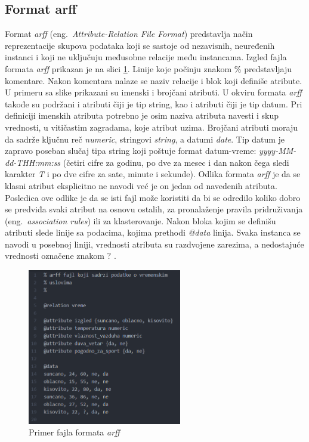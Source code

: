 \documentclass[12pt,oneside]{memoir}
\begin{document}
\subsection{Format arff}
Format \textit{arff} (eng.~\textit{Attribute-Relation File Format}) predstavlja način reprezentacije skupova podataka koji se sastoje od nezavisnih, neuređenih instanci i koji ne uključuju međusobne relacije među instancama. Izgled fajla formata \textit{arff} prikazan je na slici \ref{fig:arff}. Linije koje počinju znakom \% predstavljaju komentare. Nakon komentara nalaze se naziv relacije i blok koji definiše atribute. U primeru sa slike prikazani su imenski i brojčani atributi. U okviru formata \textit{arff} takođe su podržani i atributi čiji je tip string, kao i atributi čiji je tip datum. Pri definiciji imenskih atributa potrebno je osim naziva atributa navesti i skup vrednosti, u vitičastim zagradama, koje atribut uzima. Brojčani atributi moraju da sadrže ključnu reč \textit{numeric}, stringovi \textit{string}, a datumi \textit{date}. Tip datum je zapravo poseban slučaj tipa string koji poštuje format datum-vreme: \textit{yyyy-MM-dd-THH:mm:ss} (četiri cifre za godinu, po dve za mesec i dan nakon čega sledi karakter \textit{T} i po dve cifre za sate, minute i sekunde). Odlika formata \textit{arff} je da se klasni atribut eksplicitno ne navodi već je on jedan od navedenih atributa. Posledica ove odlike je da se isti fajl može koristiti da bi se odredilo koliko dobro se predviđa svaki atribut na osnovu ostalih, za pronalaženje pravila pridruživanja (eng.~\textit{association rules}) ili za klasterovanje. Nakon bloka kojim se definišu atributi slede linije sa podacima, kojima prethodi \textit{@data} linija. Svaka instanca se navodi u posebnoj liniji, vrednosti atributa su razdvojene zarezima, a nedostajuće vrednosti označene znakom $?$ \cite{weka}. 

\begin{figure}[!ht]
  \centering
  \includegraphics[width=0.60\textwidth]{arff.png}
  \caption{Primer fajla formata \textit{arff}}
  \label{fig:arff}
\end{figure}
\end{document}
